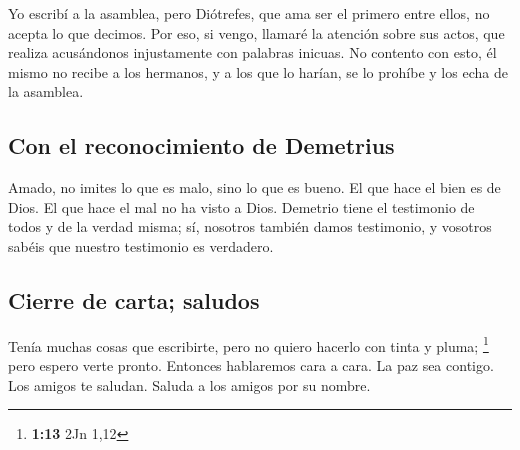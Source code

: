  Yo escribí a la asamblea, pero Diótrefes, que ama ser el
primero entre ellos, no acepta lo que decimos.  Por eso,
si vengo, llamaré la atención sobre sus actos, que realiza acusándonos
injustamente con palabras inicuas. No contento con esto, él mismo no
recibe a los hermanos, y a los que lo harían, se lo prohíbe y los echa
de la asamblea.

\hypertarget{con-el-reconocimiento-de-demetrius}{%
\subsection{Con el reconocimiento de
Demetrius}\label{con-el-reconocimiento-de-demetrius}}

 Amado, no imites lo que es malo, sino lo que es bueno.
El que hace el bien es de Dios. El que hace el mal no ha visto a Dios.
 Demetrio tiene el testimonio de todos y de la verdad
misma; sí, nosotros también damos testimonio, y vosotros sabéis que
nuestro testimonio es verdadero.

\hypertarget{cierre-de-carta-saludos}{%
\subsection{Cierre de carta; saludos}\label{cierre-de-carta-saludos}}

 Tenía muchas cosas que escribirte, pero no quiero
hacerlo con tinta y pluma; \footnote{\textbf{1:13} 2Jn 1,12}
 pero espero verte pronto. Entonces hablaremos cara a
cara. La paz sea contigo. Los amigos te saludan. Saluda a los amigos por
su nombre.

